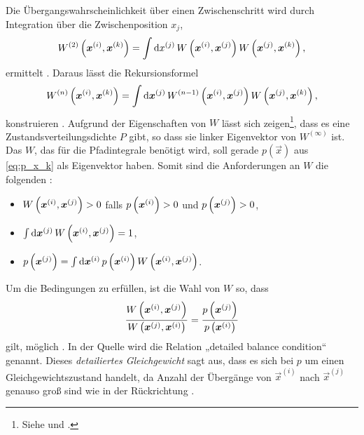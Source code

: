 Die Übergangswahrscheinlichkeit über einen Zwischenschritt wird durch
Integration über die Zwischenposition $x_j$,
\[
    W^{(2)}\del{\vec x^{(i)}, \vec x^{(k)}} = \int \dif x^{(j)} \, W\del{\vec
    x^{(i)}, \vec x^{(j)}} W\del{\vec x^{(j)}, \vec x^{(k)}},
\]
ermittelt \parencite[(3.9)]{Creutz/Statistical_Approach_QM}. Daraus lässt die
Rekursionsformel
\[
    W^{(n)}\del{\vec x^{(i)}, \vec x^{(k)}} = \int \dif \vec x^{(j)} \,
    W^{(n-1)}\del{\vec x^{(i)},
    \vec x^{(j)}} W\del{\vec x^{(j)}, \vec x^{(k)}},
\]
konstruieren \parencite[(3.10)]{Creutz/Statistical_Approach_QM}. Aufgrund der
Eigenschaften von $W$ lässt sich zeigen\footnote{Siehe
    \parencite[435]{Creutz/Statistical_Approach_QM} und
\parencite[Anhang~B]{Creutz/Statistical_Approach_QM}.}, dass es eine
Zustandsverteilungsdichte $P$ gibt, so dass sie linker Eigenvektor von
$W^{(\infty)}$ ist. Das $W$, das für die Pfadintegrale benötigt wird, soll gerade
$p(\vec x)$ aus \eqref{eq:p_x_k} als Eigenvektor haben. Somit sind die
Anforderungen an $W$ die folgenden \parencite[(3.18)]{Creutz/Statistical_Approach_QM}:
\begin{itemize}
    \item
        $W\del{\vec x^{(i)}, \vec x^{(j)}} > 0$ falls $p\del{\vec x^{(i)}} > 0$
        und $p\del{\vec x^{(j)}} > 0$,
    \item
        $\int \dif \vec x^{(j)} \, W\del{\vec x^{(i)}, \vec x^{(j)}} = 1$,
    \item
        $p\del{\vec x^{(j)}} = \int \dif \vec x^{(i)} \, p\del{\vec x^{(i)}}
        W\del{\vec x^{(i)}, \vec x^{(j)}}$.
\end{itemize}


Um die Bedingungen zu erfüllen, ist die Wahl von $W$ so, dass
\[
    \frac{W\del{\vec x^{(i)}, \vec x^{(j)}}}{W\del{\vec x^{(j)}, \vec x^{(i)}}}
    = \frac{p\del{\vec x^{(j)}}}{p\del{\vec x^{(i)}}}
\]
gilt, möglich \parencite[(3.23)]{Creutz/Statistical_Approach_QM}. In der Quelle
wird die Relation „detailed balance condition“ genannt. Dieses
\emph{detailiertes Gleichgewicht} sagt aus, dass es sich bei $p$ um einen
Gleichgewichtszustand handelt, da Anzahl der Übergänge von $\vec x^{(i)}$ nach
$\vec x^{(j)}$ genauso groß sind wie in der Rückrichtung
\parencite[85]{Schwabl/Quantenmechanik_fuer_Fortgeschrittene}.

